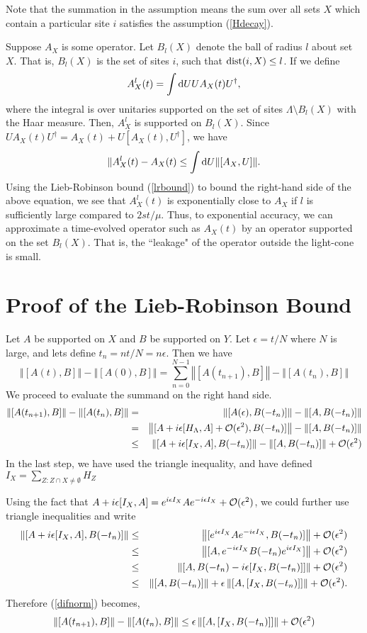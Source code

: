 \documentclass[twoside]{article}
\newcommand{\ret}{\nonumber \\}
\newcommand{\be}{\begin{equation}}
\newcommand{\ee}{\end{equation}}
\begin{document}
Note that the summation in the assumption means the sum over all sets $X$ which contain a particular site $i$ satisfies the assumption (\ref{Hdecay}).

Suppose $A_X$ is some operator.  Let $B_l(X)$ denote the ball of radius $l$ about
set $X$.  That is, $B_l(X)$ is the set of sites $i$, such that ${\rm dist}(i,X)\leq l$.
If we define
\be
\label{localized}
A_X^l(t)=\int {\rm d}U U A_X(t) U^\dagger,
\ee
where the integral is over unitaries supported on the set of sites $\Lambda \setminus  B_l(X)$ with the Haar measure.
Then, $A_X^l$ is supported on $B_l(X)$.  Since $U A_X(t)  U^\dagger=A_X(t)+U[A_X(t),U^\dagger]$, we have
\be
\Vert A_X^l(t)-A_X(t) \leq \int {\rm d}U \Vert [A_X ,U] \Vert.
\ee
Using the Lieb-Robinson bound (\ref{lrbound}) to bound the right-hand side of the above equation,
we see that $A_X^l(t)$ is exponentially close to $A_X$ if $l$ is sufficiently large compared to $2st/\mu$.  Thus,
to exponential accuracy, we can approximate a time-evolved operator such as $A_X(t)$ by an operator supported on the set
$B_l(X)$.  That is, the ``leakage" of the operator outside the light-cone is small.

\section{Proof of the Lieb-Robinson Bound}
Let $A$ be supported on $X$ and $B$ be supported on $Y$. Let $\epsilon = t/N$ where $N$ is large, and lets define $t_n = nt/N = n\epsilon$. Then we have
\be
\left\Vert[A(t),B]\right\Vert-\left\Vert[A(0),B]\right\Vert 
=\sum_{n=0}^{N-1}
\left\Vert[A(t_{n+1}),B]\right\Vert-\left\Vert[A(t_n),B]\right\Vert
\label{sumid} 
\ee
We proceed to evaluate the summand on the right hand side.
\begin{eqnarray}
\left\Vert[A(t_{n+1}),B]\right\Vert-\left\Vert[A(t_n),B]\right\Vert
&=&\left\Vert[A(\epsilon),B(-t_n)]\right\Vert-\left\Vert[A,B(-t_n)]\right\Vert\ret
&=&\left\Vert[A+i\epsilon[H_\Lambda,A]+{\cal O}(\epsilon^2),B(-t_n)]\right\Vert
-\left\Vert[A,B(-t_n)]\right\Vert\ret
&\le&\left\Vert[A+i\epsilon[I_X,A],B(-t_n)]\right\Vert
-\left\Vert[A,B(-t_n)]\right\Vert+{\cal O}(\epsilon^2)
\label{difnorm}
\end{eqnarray}
In the last step, we have used the triangle inequality, and have defined $I_X=\sum_{Z:Z\cap X\ne \emptyset}H_Z$

Using the fact that $A+i\epsilon[I_X,A]=e^{i\epsilon I_X}Ae^{-i\epsilon I_X}+{\cal O}(\epsilon^2)$, we could further use triangle inequalities and write
\begin{eqnarray}
\left\Vert[A+i\epsilon[I_X,A],B(-t_n)]\right\Vert
&\le&\left\Vert[e^{i\epsilon I_X}Ae^{-i\epsilon I_X},B(-t_n)]\right\Vert
+{\cal O}(\epsilon^2)\ret
&\le&\left\Vert[A,e^{-i\epsilon I_X}B(-t_n)e^{i\epsilon I_X}]\right\Vert
+{\cal O}(\epsilon^2)\ret
&\le&\left\Vert[A,B(-t_n)-i\epsilon[I_X,B(-t_n)]]\right\Vert
+{\cal O}(\epsilon^2)\ret
&\le&\left\Vert[A,B(-t_n)]\right\Vert+\epsilon\left\Vert[A,[I_X,B(-t_n)]]\right\Vert
+{\cal O}(\epsilon^2). 
\end{eqnarray}
Therefore (\ref{difnorm}) becomes,
\be
\left\Vert[A(t_{n+1}),B]\right\Vert-\left\Vert[A(t_n),B]\right\Vert \le \epsilon\left\Vert[A,[I_X,B(-t_n)]]\right\Vert+{\cal O}(\epsilon^2)
\ee
\end{document}

